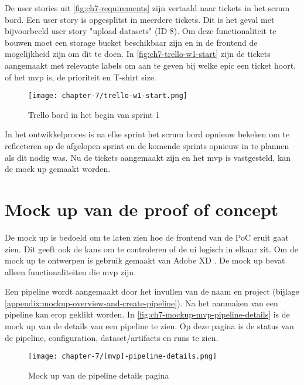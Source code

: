 De user stories uit \autoref{fig:ch7-requirements} zijn vertaald naar tickets in het scrum bord. Een user story is opgesplitst in meerdere tickets. Dit is het geval met bijvoorbeeld user story \string"upload datasets\string" (ID 8). Om deze functionaliteit te bouwen moet een storage bucket beschikbaar zijn en in de frontend de mogelijkheid zijn om dit te doen. In \autoref{fig:ch7-trello-w1-start} zijn de tickets aangemaakt met relevante labels om aan te geven bij welke epic een ticket hoort, of het \acrshort{mvp} is, de prioriteit en T-shirt size.

\begin{figure}[hbt!]
  \centering
  \texttt{[image: chapter-7/trello-w1-start.png]}
  \caption{Trello bord in het begin van sprint 1}
  \label{fig:ch7-trello-w1-start}
\end{figure}

In het ontwikkelproces is na elke sprint het scrum bord opnieuw bekeken om te reflecteren op de afgelopen sprint en de komende sprints opnieuw in te plannen als dit nodig was. Nu de tickets aangemaakt zijn en het \acrshort{mvp} is vastgesteld, kan de mock up gemaakt worden.

\section{Mock up van de proof of concept}\label{sec:ch7-mock-up-van-de-proof-of-concept}
De mock up is bedoeld om te laten zien hoe de frontend van de PoC eruit gaat zien. Dit geeft ook de kans om te controleren of de \acrfull{ui} logisch in elkaar zit. Om de mock up te ontwerpen is gebruik gemaakt van Adobe XD \cite{adobe-xd}. De mock up bevat alleen functionaliteiten die \acrshort{mvp} zijn. 

Een pipeline wordt aangemaakt door het invullen van de naam en project (bijlage \ref{appendix:mockup-overview-and-create-pipeline}). Na het aanmaken van een pipeline kan erop geklikt worden. In \autoref{fig:ch7-mockup-mvp-pipeline-details} is de mock up van de details van een pipeline te zien. Op deze pagina is de status van de pipeline, configuration, dataset/\glspl{artifact} en runs te zien.

\begin{figure}[hbt!]
  \centering
  \texttt{[image: chapter-7/[mvp]-pipeline-details.png]}
  \caption{Mock up van de pipeline details pagina}
  \label{fig:ch7-mockup-mvp-pipeline-details}
\end{figure}


